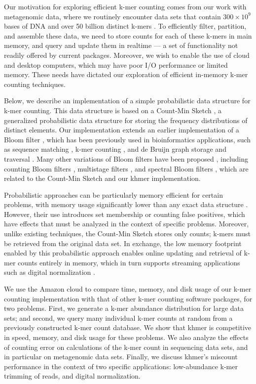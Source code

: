 Our motivation for exploring efficient k-mer counting comes from our
work with metagenomic data, where we routinely encounter data sets
that contain $300 \times 10^9$ bases of DNA and over 50 billion
distinct k-mers \cite{Howe2012}.  To efficiently filter, partition,
and assemble these data, we need to store counts for each of these
k-mers in main memory, and query and update them in realtime --- a set
of functionality not readily offered by current packages.  Moreover,
we wish to enable the use of cloud and desktop computers, which may
have poor I/O performance or limited memory. These needs have dictated
our exploration of efficient in-memory k-mer counting techniques.


Below, we describe an implementation of a simple probabilistic data
structure for k-mer counting. This data structure is based on a
Count-Min Sketch \cite{Cormode2005}, a generalized probabilistic data structure for
storing the frequency distributions of distinct elements.
Our implementation extends an earlier
implementation of a Bloom filter \cite{Bloom70}, which has been previously used 
in bioinformatics applications, such as
sequence matching \cite{DBLP:conf/padl/MaldeO09}, k-mer counting \cite{Melsted2011}, 
and de Bruijn graph storage and traversal \cite{Pell2012,Jones:2012aa}.
Many other variations of Bloom filters have been proposed \cite{BroderM03}, including
counting Bloom filters \cite{Fan:2000:SCS:343571.343572}, 
multistage filters \cite{DBLP:conf/sigcomm/EstanV02}, 
and spectral Bloom filters \cite{DBLP:conf/sigmod/CohenM03}, which 
are related to the Count-Min Sketch and our khmer implementation. 
 

Probabilistic approaches can be particularly memory efficient for
certain problems, with memory usage significantly lower than any exact
data structure \cite{Pell2012}.  However, their use introduces set
membership or counting false positives, which have effects that must
be analyzed in the context of specific problems.  Moreover, unlike
existing techniques, the Count-Min Sketch stores only counts; k-mers
must be retrieved from the original data set.  In exchange, the low
memory footprint enabled by this probabilistic approach enables online
updating and retrieval of k-mer counts entirely in memory, which in
turn supports streaming applications such as digital normalization
\cite{Brown2012}.

We use the Amazon cloud to compare time, memory, and disk usage of our
k-mer counting implementation with that of other k-mer counting software packages, 
for two problems. First, we generate a k-mer abundance
distribution for large data sets; and second, we query many individual
k-mer counts at random from a previously constructed k-mer count
database.  We show that khmer is competitive in speed, memory, and
disk usage for these problems.  We also analyze the effects of
counting error on calculations of the k-mer count in sequencing data
sets, and in particular on metagenomic data sets.  Finally, we discuss
khmer's miscount performance in the context of two specific
applications: low-abundance k-mer trimming of reads, and digital
normalization.

